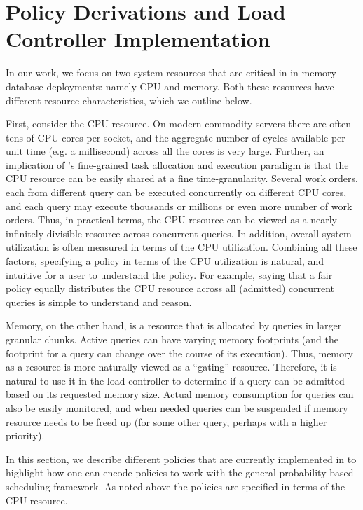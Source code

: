 \section{Policy Derivations and Load Controller Implementation}\label{sec:policy}
%
In our work, we focus on two system resources that are critical in in-memory database deployments: namely CPU and memory. Both these resources have different resource characteristics, which we outline below.

First, consider the CPU resource. 
On modern commodity servers there are often tens of CPU cores per socket, and the aggregate number of cycles available per unit time (e.g. a millisecond) across all the cores is very large. 
Further, an implication of \sys{}'s fine-grained task allocation and execution paradigm is that the CPU resource can be easily shared at a fine time-granularity. 
Several work orders, each from different query can be executed concurrently on different CPU cores, and each query may execute thousands or millions or even more number of work orders. 
Thus, in practical terms, the CPU resource can be viewed as a nearly infinitely divisible resource across concurrent queries. 
In addition, overall system utilization is often measured in terms of the CPU utilization. Combining all these factors, specifying a policy  in terms of the CPU utilization is natural, and intuitive for a user to understand the policy. 
For example, saying that a fair policy equally distributes the CPU resource across all (admitted) concurrent queries is simple to understand and reason. 

Memory, on the other hand, is a resource that is allocated by queries in larger granular chunks. 
Active queries can have varying memory footprints (and the footprint for a query can change over the course of its execution). 
Thus, memory as a resource is more naturally viewed as a ``gating'' resource. 
Therefore, it is natural to use it in the load controller to determine if a query can be admitted based on its requested memory size. 
Actual memory consumption for queries can also be easily monitored, and when needed queries can be suspended if memory resource needs to be freed up (for some other query, perhaps with a higher priority). 

In this section, we describe different policies that are currently implemented in \sys{} to highlight how one can encode policies to work with the general probability-based scheduling framework. 
As noted above the policies are specified in terms of the CPU resource. 

